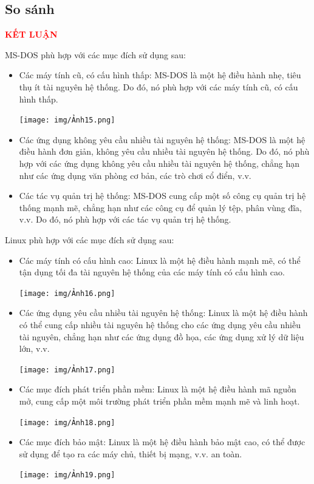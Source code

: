 \documentclass[12pt,a4paper]{article}
\begin{document}
\subsection{So sánh}

\newpage
{}
\begin{center}
	{\fontsize{30}{14}\selectfont \textbf{\textcolor{red}{KẾT LUẬN}}}
\end{center}
MS-DOS phù hợp với các mục đích sử dụng sau:
\begin{itemize}
	\item Các máy tính cũ, có cấu hình thấp: MS-DOS là một hệ điều hành nhẹ, tiêu thụ ít tài nguyên hệ thống. Do đó, nó phù hợp với các máy tính cũ, có cấu hình thấp.
	\begin{center}
		\texttt{[image: img/Ảnh15.png]}
	\end{center}
	\item Các ứng dụng không yêu cầu nhiều tài nguyên hệ thống: MS-DOS là một hệ điều hành đơn giản, không yêu cầu nhiều tài nguyên hệ thống. Do đó, nó phù hợp với các ứng dụng không yêu cầu nhiều tài nguyên hệ thống, chẳng hạn như các ứng dụng văn phòng cơ bản, các trò chơi cổ điển, v.v.
	\item Các tác vụ quản trị hệ thống: MS-DOS cung cấp một số công cụ quản trị hệ thống mạnh mẽ, chẳng hạn như các công cụ để quản lý tệp, phân vùng đĩa, v.v. Do đó, nó phù hợp với các tác vụ quản trị hệ thống.
\end{itemize}
Linux phù hợp với các mục đích sử dụng sau:
\begin{itemize}
	\item Các máy tính có cấu hình cao: Linux là một hệ điều hành mạnh mẽ, có thể tận dụng tối đa tài nguyên hệ thống của các máy tính có cấu hình cao.
	\begin{center}
		\texttt{[image: img/Ảnh16.png]}
	\end{center}
	\item Các ứng dụng yêu cầu nhiều tài nguyên hệ thống: Linux là một hệ điều hành có thể cung cấp nhiều tài nguyên hệ thống cho các ứng dụng yêu cầu nhiều tài nguyên, chẳng hạn như các ứng dụng đồ họa, các ứng dụng xử lý dữ liệu lớn, v.v.
	\begin{center}
		\texttt{[image: img/Ảnh17.png]}
	\end{center}
	\item Các mục đích phát triển phần mềm: Linux là một hệ điều hành mã nguồn mở, cung cấp một môi trường phát triển phần mềm mạnh mẽ và linh hoạt.
	\begin{center}
		\texttt{[image: img/Ảnh18.png]}
	\end{center}
	\item Các mục đích bảo mật: Linux là một hệ điều hành bảo mật cao, có thể được sử dụng để tạo ra các máy chủ, thiết bị mạng, v.v. an toàn.\\
	\begin{center}
		\texttt{[image: img/Ảnh19.png]}
	\end{center}
\end{itemize}
\end{document}
